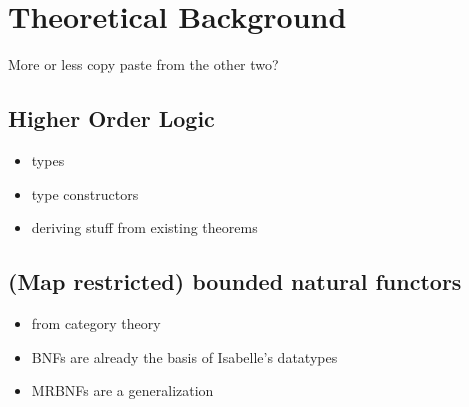 \chapter{Theoretical Background}

More or less copy paste from the other two?

\section{Higher Order Logic}

\begin{itemize}
\item{types}
\item{type constructors}
\item{deriving stuff from existing theorems}
\end{itemize}

\section{(Map restricted) bounded natural functors}\label{sec:mrbnf_theory}

\begin{itemize}
\item{from category theory}
\item{BNFs are already the basis of Isabelle's datatypes}
\item{MRBNFs are a generalization}
\end{itemize}
